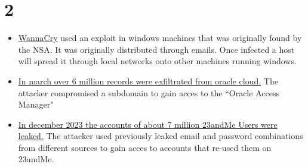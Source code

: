 \documentclass{article}
\begin{document}
	\maketitle
	\section*{2}
	\begin{itemize}
		\item
		    \href{https://arstechnica.com/information-technology/2017/04/10000-windows-computers-may-be-infected-by-advanced-nsa-backdoor/}
				{WannaCry} used an exploit in windows machines that was originally found by the NSA.
			It was originally distributed through emails.
			Once infected a host will spread it through local networks onto other machines running windows.
		\item
			\href{https://www.cloudsek.com/blog/the-biggest-supply-chain-hack-of-2025-6m-records-for-sale-exfiltrated-from-oracle-cloud-affecting-over-140k-tenants#analysis}
			    {In march over 6 million records were exfiltrated from oracle cloud.}
			The attacker compromised a subdomain to gain acces to the ``Oracle Access Manager"
		\item
			\href{https://www.theguardian.com/technology/2023/dec/05/23andme-hack-data-breach}
    			{In december 2023 the accounts of about 7 million 23andMe Users were leaked.}
            The attacker used previously leaked email and password combinations from different sources
            to gain acces to accounts that re-used them on 23andMe.
    \end{itemize}
\end{document}
